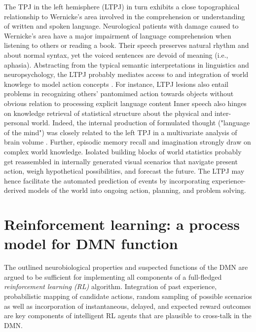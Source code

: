 \documentclass[10pt,letterpaper]{article}
\begin{document}
The TPJ in the left hemisphere (LTPJ) in turn exhibits a close topographical relationship to Wernicke's area
involved in the comprehension or understanding of written and spoken language.
Neurological patients with damage caused to Wernicke's area
have a major impairment of language comprehension
when listening to others or reading a book.
Their speech
preserves natural rhythm and about normal syntax, yet the
voiced sentences are devoid of meaning (i.e., aphasia).
Abstracting from the typical semantic interpretations in linguistics
and neuropsychology,
the LTPJ probably mediates access to and integration of world knowlege
to model action concepts
\citep{binder2011neurobiology, seghier2013angular}.
For instance, LTPJ lesions also entail problems in recognizing
others' pantomimed action towards objects
without obvious relation to processing explicit language content
\citep{varney1987locus}
%
Inner speech also hinges on knowledge retrieval of statistical structure
about the physical and inter-personal world.
Indeed,
the internal production of
formulated thought ("language of the mind") was closely related to the left TPJ
in a multivariate analysis of brain volume
\citep{geva2011neural}.
Further,
episodic memory recall and imagination strongly draw on
complex world knowledge.
Isolated building blocks of world statistics probably get reassembled
in internally generated visual scenarios that
navigate present action, weigh hypothetical possibilities, and forecast the future.
%
The LTPJ may hence facilitate the automated prediction of events
by incorporating experience-derived models of the world
into ongoing action, planning, and problem solving.



\section{Reinforcement learning: a process model for DMN function}
The outlined neurobiological properties and suspected functions of the DMN
are argued to be sufficient
for implementing all components
of a full-fledged \textit{reinforcement learning (RL)} algorithm.
Integration of past experience, probabilistic mapping of candidate actions,
random sampling of possible scenarios as well as
incorporation of instantaneous, delayed, and expected reward outcomes
are key components of intelligent RL agents
that are plausible to cross-talk in the DMN.
\end{document}
